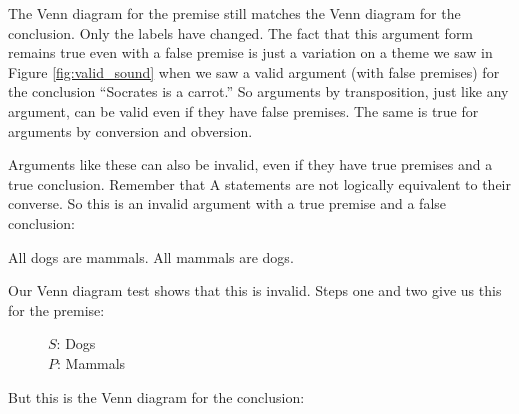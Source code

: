 The Venn diagram for the premise still matches the Venn diagram for the conclusion. Only the labels have changed. The fact that this argument form remains true even with a false premise is just a variation on a theme we saw in
Figure \ref{fig:valid_sound} when we saw a valid argument (with false premises) for the conclusion ``Socrates is a carrot.'' So arguments by transposition, just like any argument, can be valid even if they have false premises. The same is true for arguments by conversion and obversion.

Arguments like these can also be invalid, even if they have true premises and a true conclusion. Remember that A statements are not logically equivalent to their converse. So this is an invalid argument with a true premise and a false conclusion:

\begin{earg*}
\item All dogs are mammals.
\itemc[.3] All mammals are dogs.
\end{earg*}

Our Venn diagram test shows that this is invalid. Steps one and two give us this for the premise:
\begin{figure}[H]
\begin{center}
\end{center}
\captionsetup{singlelinecheck=on}
\caption*{$S$: Dogs \\ $P$: Mammals}
\end{figure}

But this is the Venn diagram for the conclusion:

